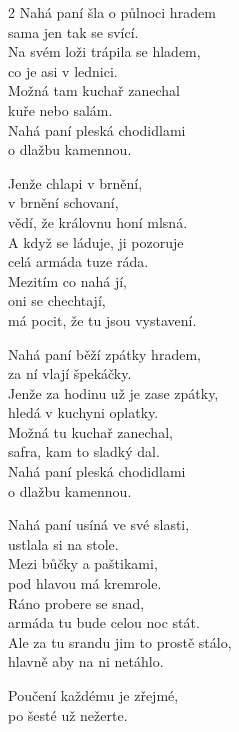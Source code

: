 
\begin{multicols}{2}
\ve{}
Nahá paní šla o půlnoci hradem\\
sama jen tak se svící.\\
Na svém loži trápila se hladem,\\
co je asi v lednici.\\
Možná tam kuchař zanechal\\
kuře nebo salám.\\
Nahá paní pleská chodidlami\\
o dlažbu kamennou. 

\cho{}
Jenže chlapi v brnění,\\
v brnění schovaní,\\
vědí, že královnu honí mlsná.\\
A když se láduje, ji pozoruje\\
celá armáda tuze ráda.\\
Mezitím co nahá jí,\\
oni se chechtají,\\ 
má pocit, že tu jsou vystavení. 

\end{multicols}

\ve{}
Nahá paní běží zpátky hradem,\\
za ní vlají špekáčky.\\
Jenže za hodinu už je zase zpátky,\\
hledá v kuchyni oplatky.\\
Možná tu kuchař zanechal,\\
safra, kam to sladký dal.\\
Nahá paní pleská chodidlami\\
o dlažbu kamennou.

\ve{}
Nahá paní usíná ve své slasti,\\
ustlala si na stole.\\
Mezi bůčky a paštikami,\\
pod hlavou má kremrole.\\
Ráno probere se snad,\\
armáda tu bude celou noc stát.\\
Ale za tu srandu jim to prostě stálo,\\
hlavně aby na ni netáhlo.

\cho{}

\ve{}
Poučení každému je zřejmé,\\
po šesté už nežerte.

\esong{}